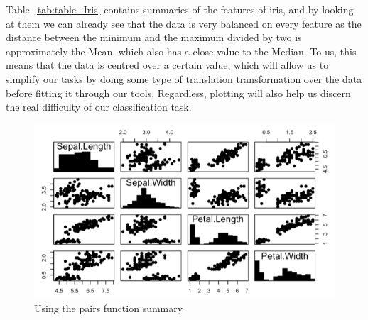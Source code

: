 Table~\ref{tab:table_Iris} contains summaries of the features of iris, and by looking at them we can already see that the data is very balanced on every feature as the distance between the minimum and the maximum divided by two is approximately the Mean, which also has a close value to the Median. To us, this means that the data is centred over a certain value, which will allow us to simplify our tasks by doing some type of translation transformation over the data before fitting it through our tools. Regardless, plotting will also help us discern the real difficulty of our classification task.
%
\begin{figure}[H]
	\centering
	\includegraphics[width=13cm]{Figuras_tfg/Figure_Iris_Histogram}
	\caption{Using the pairs function summary}
	\label{fig:figure_pairs_iris}
\end{figure}


